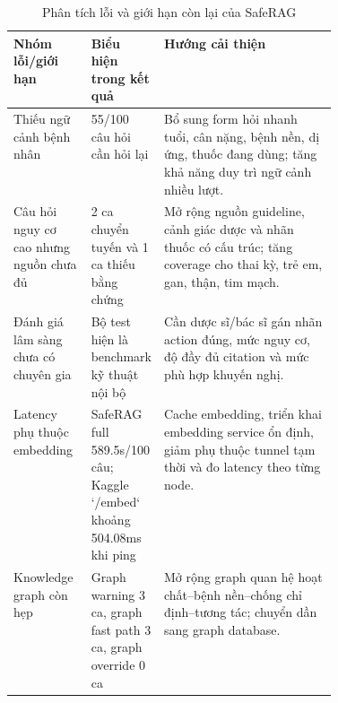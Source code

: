 \begin{table}[H]
\centering
\small
\caption{Phân tích lỗi và giới hạn còn lại của SafeRAG}
\begin{tabularx}{\linewidth}{L{0.24\linewidth} L{0.18\linewidth} Y}
\toprule
\textbf{Nhóm lỗi/giới hạn} & \textbf{Biểu hiện trong kết quả} & \textbf{Hướng cải thiện} \\
\midrule
Thiếu ngữ cảnh bệnh nhân & 55/100 câu hỏi cần hỏi lại & Bổ sung form hỏi nhanh tuổi, cân nặng, bệnh nền, dị ứng, thuốc đang dùng; tăng khả năng duy trì ngữ cảnh nhiều lượt. \\
Câu hỏi nguy cơ cao nhưng nguồn chưa đủ & 2 ca chuyển tuyến và 1 ca thiếu bằng chứng & Mở rộng nguồn guideline, cảnh giác dược và nhãn thuốc có cấu trúc; tăng coverage cho thai kỳ, trẻ em, gan, thận, tim mạch. \\
Đánh giá lâm sàng chưa có chuyên gia & Bộ test hiện là benchmark kỹ thuật nội bộ & Cần dược sĩ/bác sĩ gán nhãn action đúng, mức nguy cơ, độ đầy đủ citation và mức phù hợp khuyến nghị. \\
Latency phụ thuộc embedding & SafeRAG full 589.5s/100 câu; Kaggle `/embed` khoảng 504.08ms khi ping & Cache embedding, triển khai embedding service ổn định, giảm phụ thuộc tunnel tạm thời và đo latency theo từng node. \\
Knowledge graph còn hẹp & Graph warning 3 ca, graph fast path 3 ca, graph override 0 ca & Mở rộng graph quan hệ hoạt chất--bệnh nền--chống chỉ định--tương tác; chuyển dần sang graph database. \\
\bottomrule
\end{tabularx}
\end{table}

